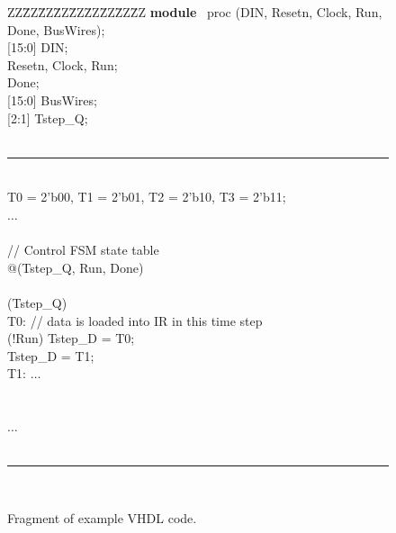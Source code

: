 \documentclass[11pt, twoside, pdftex]{article}
\begin{document}
\begin{figure}[H]
\begin{center}
\begin{minipage}[t]{12.5 cm}
\begin{tabbing}
ZZ\=ZZ\=ZZ\=ZZ\=ZZ\=ZZ\=ZZ\=ZZ\=ZZ\kill
{\bf module} ~proc (DIN, Resetn, Clock, Run, Done, BusWires);\\
 [15:0] DIN;\\
 Resetn, Clock, Run;\\
 Done;\\
 [15:0] BusWires;\\
 [2:1] Tstep\_Q;\\
~\rule{5.0in}{0in}\\
 T0 = 2'b00, T1 = 2'b01, T2 = 2'b10, T3 = 2'b11;\\
\>$\ldots$\\
~\\
\>// Control FSM state table\\
 @(Tstep\_Q, Run, Done)\\
\\
\> (Tstep\_Q)\\
\>\>\>T0: // data is loaded into IR in this time step\\
\>\>\> (!Run) Tstep\_D = T0;\\
\>\>\> Tstep\_D = T1;\\
\>\>\>T1: $\ldots$\\
\>\\
\\

\>$\ldots$\\

~\rule{5.0in}{0in}\\
\end{tabbing}
\end{minipage}
\end{center}
\caption{Fragment of example VHDL code.} 
\label{fig:fig28}
\end{figure}
\end{document}
